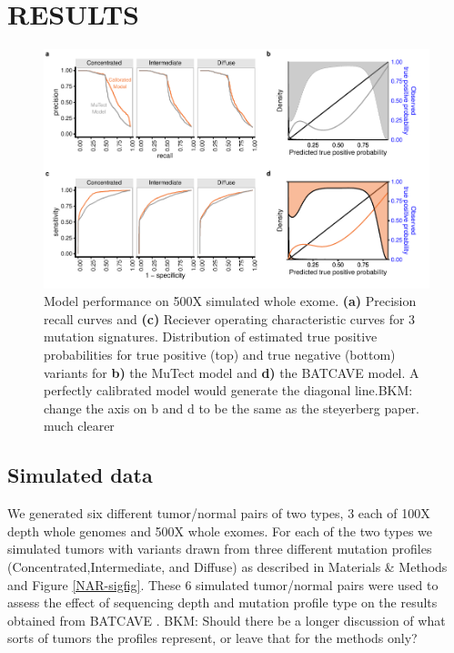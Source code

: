 \documentclass[a4,center,fleqn]{NAR}
\newcommand{\bkmcomment}[1]{{\color{blue}BKM: #1}}
\newcommand{\batcave}{BATCAVE }
\begin{document}
\section{RESULTS}
\begin{figure}
  \begin{center}
  \includegraphics{figures/fig_wes.pdf}
  \end{center}
  \caption{Model performance on 500X simulated whole exome.
  \textbf{(a)} Precision recall curves and \textbf{(c)} Reciever operating characteristic curves for 3 mutation signatures.
  Distribution of estimated true positive probabilities for true positive (top) and true negative (bottom) variants for \textbf{b)} the MuTect model and \textbf{d)} the \batcave model.
  A perfectly calibrated model would generate the diagonal line.\bkmcomment{change the axis on b and d to be the same as the steyerberg paper. much clearer}}
\label{NAR-wes_fig}
\end{figure}

\subsection{Simulated data}
We generated six different tumor/normal pairs of two types, 3 each of 100X depth whole genomes and 500X whole exomes.
For each of the two types we simulated tumors with variants drawn from three different mutation profiles (Concentrated,Intermediate, and Diffuse) as described in Materials \& Methods and Figure \ref{NAR-sigfig}.
These 6 simulated tumor/normal pairs were used to assess the effect of sequencing depth and mutation profile type on the results obtained from \batcave.
\bkmcomment{Should there be a longer discussion of what sorts of tumors the profiles represent, or leave that for the methods only?}
\end{document}
